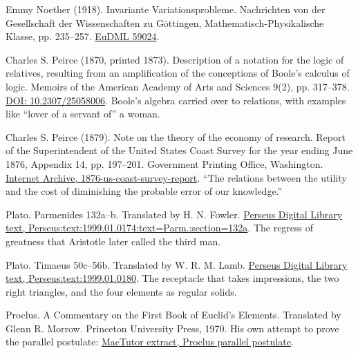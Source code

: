 \documentclass[11pt,twoside]{article}
\theoremstyle{thielethm}
\theoremstyle{thieledef}
\theoremstyle{thieledef}
\theoremstyle{thieledef}
\theoremstyle{thielethm}
\theoremstyle{thieleobs}
\theoremstyle{thielethm}
\begin{document}
\noindent Emmy Noether (1918). Invariante Variationsprobleme. Nachrichten von der Gesellschaft der Wissenschaften zu G\"ottingen, Mathematisch-Physikalische Klasse, pp. 235--257. \href{https://eudml.org/doc/59024}{EuDML 59024}.
\par\medskip

\noindent Charles S. Peirce (1870, printed 1873). Description of a notation for the logic of relatives, resulting from an amplification of the conceptions of Boole's calculus of logic. Memoirs of the American Academy of Arts and Sciences 9(2), pp. 317--378. \href{https://doi.org/10.2307/25058006}{DOI: 10.2307/25058006}. Boole's algebra carried over to relations, with examples like ``lover of a servant of'' a woman.
\par\medskip

\noindent Charles S. Peirce (1879). Note on the theory of the economy of research. Report of the Superintendent of the United States Coast Survey for the year ending June 1876, Appendix 14, pp. 197--201. Government Printing Office, Washington. \href{https://archive.org/details/1876-us-coast-survey-report}{Internet Archive, 1876-us-coast-survey-report}. ``The relations between the utility and the cost of diminishing the probable error of our knowledge.''
\par\medskip

\noindent Plato. Parmenides 132a--b. Translated by H. N. Fowler. \href{https://www.perseus.tufts.edu/hopper/text?doc=Perseus:text:1999.01.0174:text=Parm.:section=132a}{Perseus Digital Library text, Perseus:text:1999.01.0174:text=Parm.:section=132a}. The regress of greatness that Aristotle later called the third man.
\par\medskip

\noindent Plato. Timaeus 50c--56b. Translated by W. R. M. Lamb. \href{https://www.perseus.tufts.edu/hopper/text?doc=Perseus:text:1999.01.0180}{Perseus Digital Library text, Perseus:text:1999.01.0180}. The receptacle that takes impressions, the two right triangles, and the four elements as regular solids.
\par\medskip

\noindent Proclus. A Commentary on the First Book of Euclid's Elements. Translated by Glenn R. Morrow. Princeton University Press, 1970. His own attempt to prove the parallel postulate: \href{https://mathshistory.st-andrews.ac.uk/Extras/Proclus_parallel_postulate/}{MacTutor extract, Proclus parallel postulate}.
\par\medskip
\end{document}
